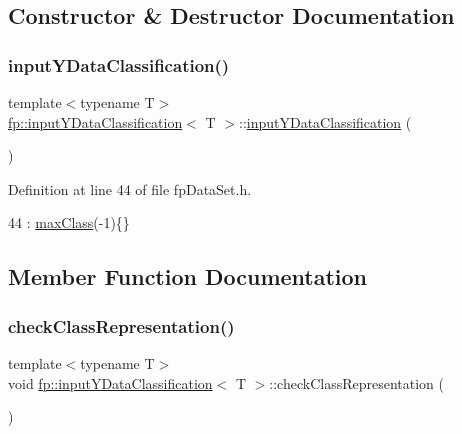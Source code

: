 \subsection{Constructor \& Destructor Documentation}
\mbox{\label{classfp_1_1inputYDataClassification_ab61978051d41e7a91fc778c7997a5db2}} 
\subsubsection{\texorpdfstring{input\+Y\+Data\+Classification()}{inputYDataClassification()}}
{\footnotesize\ttfamily template$<$typename T$>$ \\
\hyperlink{classfp_1_1inputYDataClassification}{fp\+::input\+Y\+Data\+Classification}$<$ T $>$\+::\hyperlink{classfp_1_1inputYDataClassification}{input\+Y\+Data\+Classification} (\begin{DoxyParamCaption}{ }\end{DoxyParamCaption})\hspace{0.3cm}{\ttfamily [inline]}}



Definition at line 44 of file fp\+Data\+Set.\+h.


\begin{DoxyCode}
44 : \hyperlink{classfp_1_1inputYDataClassification_a5edb210f521aebaaf8d73b5c9ef68cf1}{maxClass}(-1)\{\}
\end{DoxyCode}


\subsection{Member Function Documentation}
\mbox{\label{classfp_1_1inputYDataClassification_a3d75b2eec77611b51722018637b8c7e1}} 
\subsubsection{\texorpdfstring{check\+Class\+Representation()}{checkClassRepresentation()}}
{\footnotesize\ttfamily template$<$typename T$>$ \\
void \hyperlink{classfp_1_1inputYDataClassification}{fp\+::input\+Y\+Data\+Classification}$<$ T $>$\+::check\+Class\+Representation (\begin{DoxyParamCaption}{ }\end{DoxyParamCaption})\hspace{0.3cm}{\ttfamily [inline]}}



